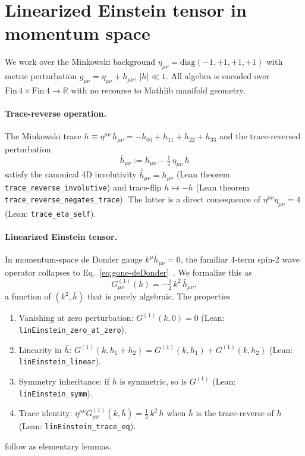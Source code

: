 \documentclass[aps,prd,twocolumn,showpacs,superscriptaddress,nofootinbib]{revtex4-2}
\begin{document}
\section{Linearized Einstein tensor in momentum space}
\label{sec:linearized-tensor}

We work over the Minkowski background
$\eta_{\mu\nu} = \mathrm{diag}(-1,+1,+1,+1)$ with metric perturbation
$g_{\mu\nu} = \eta_{\mu\nu} + h_{\mu\nu}$, $|h| \ll 1$. All algebra is
encoded over $\mathrm{Fin}\,4 \times \mathrm{Fin}\,4 \to \mathbb{R}$ with
no recourse to Mathlib manifold geometry.

\paragraph*{Trace-reverse operation.}
The Minkowski trace
$h \equiv \eta^{\mu\nu}\,h_{\mu\nu} = -h_{00} + h_{11} + h_{22} + h_{33}$
and the trace-reversed perturbation
\begin{equation}
\label{eq:trace-reverse}
\bar{h}_{\mu\nu} := h_{\mu\nu} - \tfrac{1}{2}\,\eta_{\mu\nu}\,h
\end{equation}
satisfy the canonical 4D involutivity
$\bar{\bar{h}}_{\mu\nu} = h_{\mu\nu}$ (Lean theorem
\texttt{trace\_reverse\_involutive}) and trace-flip
$h \mapsto -h$ (Lean theorem \texttt{trace\_reverse\_negates\_trace}).
The latter is a direct consequence of $\eta^{\mu\nu}\eta_{\mu\nu} = 4$
(Lean: \texttt{trace\_eta\_self}).

\paragraph*{Linearized Einstein tensor.}
In momentum-space de Donder gauge $k^{\mu}\bar{h}_{\mu\nu} = 0$, the
familiar 4-term spin-2 wave operator collapses to
Eq.~\eqref{eq:gone-deDonder}~\cite{Carroll2004,MTW1973}. We formalize
this as
\begin{equation}
\label{eq:linEinsteinDeDonder}
G^{(1)}_{\mu\nu}(k) = -\tfrac{1}{2}\,k^{2}\,\bar{h}_{\mu\nu},
\end{equation}
a function of $(k^{2}, \bar{h})$ that is purely algebraic. The
properties
\begin{enumerate}
\item Vanishing at zero perturbation:
$G^{(1)}(k, 0) = 0$ (Lean: \texttt{linEinstein\_zero\_at\_zero}).
\item Linearity in $\bar{h}$:
$G^{(1)}(k, h_{1}+h_{2}) = G^{(1)}(k, h_{1}) + G^{(1)}(k, h_{2})$
(Lean: \texttt{linEinstein\_linear}).
\item Symmetry inheritance: if $\bar{h}$ is symmetric, so is
$G^{(1)}$ (Lean: \texttt{linEinstein\_symm}).
\item Trace identity:
$\eta^{\mu\nu} G^{(1)}_{\mu\nu}(k, \bar{h}) = \tfrac{1}{2}\,k^{2}\,h$
when $\bar{h}$ is the trace-reverse of $h$ (Lean:
\texttt{linEinstein\_trace\_eq}).
\end{enumerate}
follow as elementary lemmas.
\end{document}
